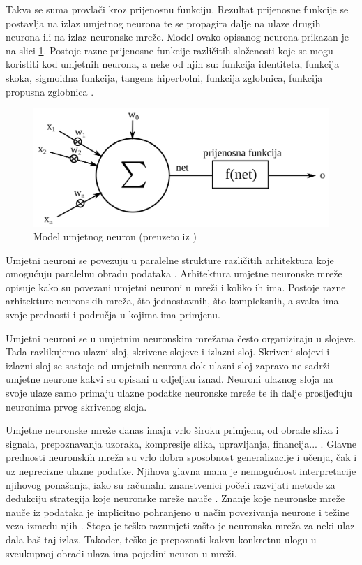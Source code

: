 \documentclass[zavrsnirad]{fer}
\begin{document}
	Takva se suma provlači kroz prijenosnu funkciju. Rezultat prijenosne funkcije se postavlja na izlaz umjetnog neurona te se propagira dalje na ulaze drugih neurona ili na izlaz neuronske mreže. Model ovako opisanog neurona prikazan je na slici \ref{modelUmjetnogNeurona}. Postoje razne prijenosne funkcije različitih složenosti koje se mogu koristiti kod umjetnih neurona, a neke od njih su: funkcija identiteta, funkcija skoka, sigmoidna funkcija, tangens hiperbolni, funkcija zglobnica, funkcija propusna zglobnica \cite{skriptaNeuronskeMreze}.
	
	\begin{figure}[htb]
		\centering
		\includegraphics[width=\textwidth]{Extra/modelUmjetnogNeurona.png} 
		\caption{Model umjetnog neuron (preuzeto iz \cite{skriptaNeuronskeMreze})}
		\label{modelUmjetnogNeurona}
	\end{figure}
	
	Umjetni neuroni se povezuju u paralelne strukture različitih arhitektura koje omogućuju paralelnu obradu podataka \cite{skriptaNeuronskeMreze}. Arhitektura umjetne neuronske mreže opisuje kako su povezani umjetni neuroni u mreži i koliko ih ima. Postoje razne arhitekture neuronskih mreža, što jednostavnih, što kompleksnih, a svaka ima svoje prednosti i područja u kojima ima primjenu.
	
	Umjetni neuroni se u umjetnim neuronskim mrežama često organiziraju u slojeve. Tada razlikujemo ulazni sloj, skrivene slojeve i izlazni sloj. Skriveni slojevi i izlazni sloj se sastoje od umjetnih neurona dok ulazni sloj zapravo ne sadrži umjetne neurone kakvi su opisani u odjeljku iznad. Neuroni ulaznog sloja na svoje ulaze samo primaju ulazne podatke neuronske mreže te ih dalje prosljeđuju neuronima prvog skrivenog sloja.
	
	Umjetne neuronske mreže danas imaju vrlo široku primjenu, od obrade slika i signala, prepoznavanja uzoraka, kompresije slika, upravljanja, financija... \cite{skriptaNeuronskeMreze}. Glavne prednosti neuronskih mreža su vrlo dobra sposobnost generalizacije i učenja, čak i uz neprecizne ulazne podatke. Njihova glavna mana je nemogućnost interpretacije njihovog ponašanja, iako su računalni znanstvenici počeli razvijati metode za dedukciju strategija koje neuronske mreže nauče \cite{MITNeuralNet}. Znanje koje neuronske mreže nauče iz podataka je implicitno pohranjeno u način povezivanja neurone i težine veza između njih \cite{skriptaNeuronskeMreze}. Stoga je teško razumjeti zašto je neuronska mreža za neki ulaz dala baš taj izlaz. Također, teško je prepoznati kakvu konkretnu ulogu u sveukupnoj obradi ulaza ima pojedini neuron u mreži.
	
\end{document}
